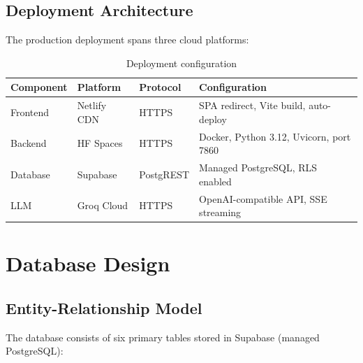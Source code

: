 \documentclass[12pt, a4paper, oneside]{report}
\begin{document}
\subsection{Deployment Architecture}

The production deployment spans three cloud platforms:

\begin{table}[H]
\centering
\caption{Deployment configuration}
\label{tab:deployment}
\begin{tabularx}{\textwidth}{@{}l l l X@{}}
\toprule
\textbf{Component} & \textbf{Platform} & \textbf{Protocol} & \textbf{Configuration} \\
\midrule
Frontend & Netlify CDN & HTTPS & SPA redirect, Vite build, auto-deploy \\
Backend & HF Spaces & HTTPS & Docker, Python 3.12, Uvicorn, port 7860 \\
Database & Supabase & PostgREST & Managed PostgreSQL, RLS enabled \\
LLM & Groq Cloud & HTTPS & OpenAI-compatible API, SSE streaming \\
\bottomrule
\end{tabularx}
\end{table}

\section{Database Design}
\label{sec:database_design}

\subsection{Entity-Relationship Model}

The database consists of six primary tables stored in Supabase (managed PostgreSQL):
\end{document}
